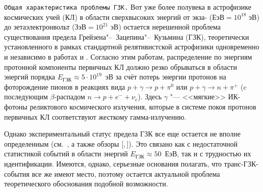 

\date{21/XII/2010}

\maketitle



 {\tt Общая характеристика проблемы ГЗК.} Вот уже более полувека в астрофизике космических  учей (КЛ) в
области сверхвысоких энергий от экза- ($\textrm{ЕэВ}=10^{18}$ эВ) до зетаэлектронвольт ($\textrm{ЗэВ}=10^{21}$ эВ) остается
нерешенной проблема существования предела Грейзена"--~Зацепина"--~Кузьмина (ГЗК), теоретически установленного в рамках
стандартной релятивистской астрофизики одновременно и независимо в работах \cite{Rudoy:GREISEN} и \cite{Rudoy:ZACEPIN}. Согласно
этим работам, распределение по энергиям протонной компоненты первичных КЛ должно резко обрываться в области энергий порядка
\mbox{$E_{\textrm{ГЗК}}\approx5\cdot10^{19}$}~эВ за счёт потерь энергии протонов на фоторождение пионов в реакциях вида
\mbox{$p{+}\gamma\rightarrow p{+}\pi^0$} или $p{+}\gamma \rightarrow n{+}\pi^+$ (c последующим $\beta$-распадом \mbox{$n\rightarrow p{+}e^{-}{+}\nu_e$}).
Здесь $\gamma$ "--- <<мягкие>>  ИК-фотоны реликтового космического излучения, которые в системе покоя протонов первичных КЛ
соответствуют жесткому гамма-излучению.

Однако экспериментальный статус предела ГЗК все еще остается не вполне определенным (см.~\cite{Rudoy:PANASUK,Rudoy:ZASOV}, а
также обзоры [,\,]). Это связано как с недостаточной статистикой событий в области
энергий $E_{\textrm{ГЗК}}\approx50$~ЕэВ, так и с трудностью их идентификации. Имеются, однако, серьезные основания полагать, что
транс-ГЗК-события все же имеют место, поэтому остается актуальной проблема теоретического обоснования подобной возможности.

